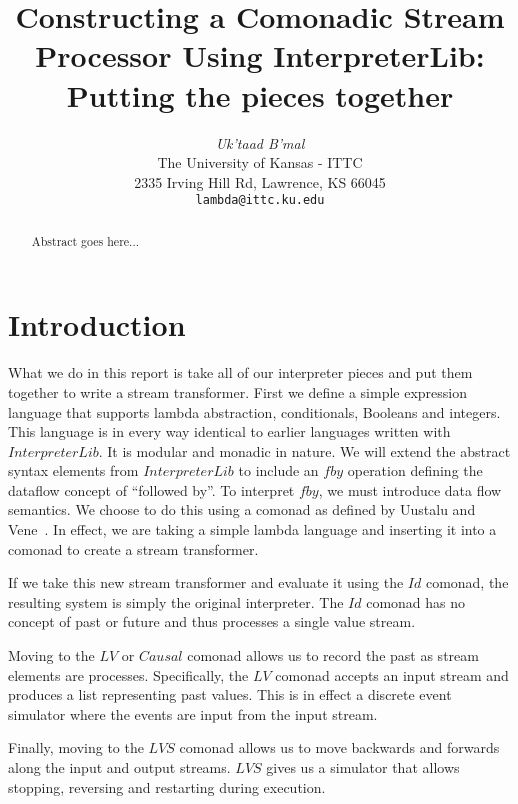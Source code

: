 \documentclass[10pt]{article}
\title{Constructing a Comonadic Stream Processor Using
  InterpreterLib:\\ Putting the pieces together}
\author{\emph{Uk'taad B'mal} \\
  The University of Kansas - ITTC \\
  2335 Irving Hill Rd, Lawrence, KS 66045 \\
  \texttt{lambda@ittc.ku.edu}}
\newcommand{\Conid}[1]{\mathit{#1}}
\newcommand{\Varid}[1]{\mathit{#1}}
\begin{document}
\maketitle

\begin{abstract}
  Abstract goes here...
\end{abstract}

\section{Introduction}

What we do in this report is take all of our interpreter pieces and
put them together to write a stream transformer.  First we define a
simple expression language that supports lambda abstraction,
conditionals, Booleans and integers.  This language is in every way
identical to earlier languages written with \ensuremath{\Conid{InterpreterLib}}.  It is
modular and monadic in nature.  We will extend the abstract syntax
elements from \ensuremath{\Conid{InterpreterLib}} to include an \ensuremath{\Varid{fby}} operation defining
the dataflow concept of ``followed by''.  To interpret \ensuremath{\Varid{fby}}, we must
introduce data flow semantics.  We choose to do this using a comonad
as defined by Uustalu and Vene~\cite{Uustalu:05:The-Essence-of-}.  In
effect, we are taking a simple lambda language and inserting it into a
comonad to create a stream transformer.

If we take this new stream transformer and evaluate it using the \ensuremath{\Conid{Id}}
comonad, the resulting system is simply the original interpreter.  The
\ensuremath{\Conid{Id}} comonad has no concept of past or future and thus processes a
single value stream.

Moving to the \ensuremath{\Conid{LV}} or \ensuremath{\Conid{Causal}} comonad allows us to record the past as
stream elements are processes.  Specifically, the \ensuremath{\Conid{LV}} comonad accepts
an input stream and produces a list representing past values.  This is
in effect a discrete event simulator where the events are input from
the input stream.

Finally, moving to the \ensuremath{\Conid{LVS}} comonad allows us to move backwards and
forwards along the input and output streams.  \ensuremath{\Conid{LVS}} gives us a
simulator that allows stopping, reversing and restarting during
execution.
\end{document}
